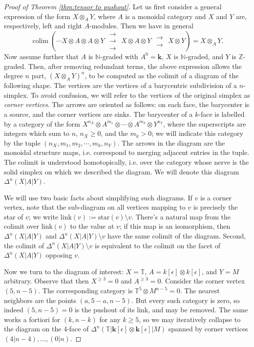 \documentclass[10pt,a4paper]{amsart}
\def\N{\mathbb{N}}
\def\Z{\mathbb{Z}}
\DeclareMathOperator{\colim}{colim}
\begin{document}
\begin{proof}[Proof of Theorem \ref{thm:tensor to pushout}]
    Let us first consider a general expression of the form $X \otimes_A Y$, where 
    $A$ is a monoidal category and $X$ and $Y$ are, respectively, left and right $A$-modules.  Then 
    we have in general 
    $$  \colim \left( \cdots X \otimes A \otimes A \otimes Y   \,\, \substack{\rightarrow\\[-.6ex] \rightarrow \\[-.6ex] \rightarrow}   \,\, X \otimes A \otimes Y  \,\, \substack{\rightarrow\\[-.6ex] \rightarrow } \,\, X \otimes Y \right) = X \otimes_A Y.$$
    Now assume further that $A$ is $\N$-graded with $A^0 = \mathbf{k}$, $X$ is $\N$-graded, and $Y$ is $\Z$-graded.    Then, after removing redundant terms, 
    the above expression allows the degree $n$ part, $(X \otimes_A Y)^n$, to be computed as the colimit of a diagram of the following shape.   The vertices are the vertices of a barycentric subdivision of a $n$-simplex. To avoid confusion, we will refer to the vertices of the original simplex as {\em corner vertices}.  The arrows are oriented as follows: on each face, the barycenter is a source, and the corner vertices are sinks.  The barycenter of a $k$-face is labelled by a category of the form $X^{n_X} \otimes A^{m_1} \otimes \cdots \otimes A^{m_k} \otimes Y^{n_Y}$, where the superscripts are integers which sum to $n$, $n_X \ge 0$, and the $m_k > 0$;  we will indicate this category by the tuple $(n_X, m_1, m_2, \cdots, m_k, n_Y)$.  The arrows in the diagram are the monoidal structure maps, i.e. correspond to merging adjacent entries in the tuple.  The colimit is understood homotopically, i.e. over the category whose nerve is the solid simplex on which we described the diagram.  We will denote this diagram $\Delta^n(X|A|Y)$.

    We will use two basic facts about simplifying such diagrams.  If $v$ is a corner vertex, note that the sub-diagram on all vertices mapping to $v$ is precisely the star of $v$; we write $\mathrm{link}(v) := \mathrm{star}(v) \setminus v$.  There's a natural map from the colimit over $\mathrm{link}(v)$ to the value at $v$; if this map is an isomorphism, then $\Delta^n(X|A|Y)$ and $\Delta^n(X|A|Y) \setminus v$ have the same colimit of the diagram.    Second,  the colimit of $\Delta^n(X|A|Y) \setminus v$ is equivalent to the colimit on the facet of $\Delta^n(X|A|Y)$ opposing $v$. 

    Now we turn to the diagram of interest: $X = \mathbb{T}$, $A= k[\epsilon] \otimes k[\epsilon]$, and $Y = M$ arbitrary.  Observe that then $X^{\ge 3} = 0$ and $A^{\ge 3} = 0$.  Consider the corner vertex $(5,n-5)$.  The corresponding category is $\mathbb{T}^5 \otimes M^{n-5} = 0$.  The nearest neighbors are the points $(a, 5-a, n-5)$.  But every such category is zero, so indeed $(5,n-5)=0$ is the pushout of its link, and may be removed.  The same works a fortiori for $(k, n-k)$ for any $k\ge 5$, so we may iteratively collapse to the diagram on the 4-face of $\Delta^n(\mathbb{T}|\mathbf{k}[\epsilon] \otimes \mathbf{k}[\epsilon]|M)$ spanned by corner vertices $(4|n-4), \ldots, (0|n)$.  
    

\end{proof}
\end{document}
